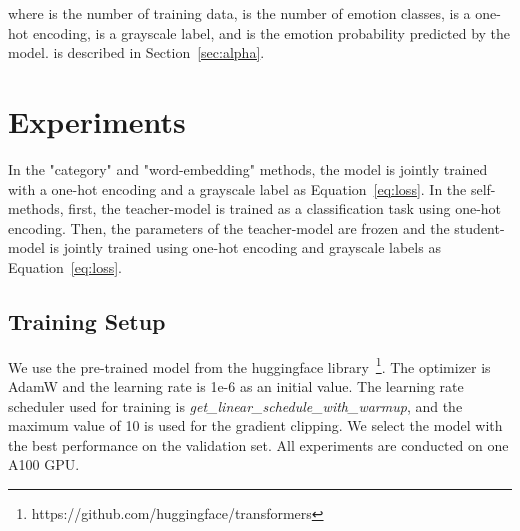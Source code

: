 \documentclass[a4paper]{article}
\begin{document}
where  is the number of training data,  is the number of emotion classes,  is a one-hot encoding,  is a grayscale label, and  is the emotion probability predicted by the model.  is described in Section~\ref{sec:alpha}.


\begin{table}[!t]
\centering
{}
\caption{Statistics for 4 datasets.}
\label{Tab:dataset}
\end{table}

\section{Experiments}
In the "category" and "word-embedding" methods, the model is jointly trained with a one-hot encoding and a grayscale label as Equation~\ref{eq:loss}. In the self-methods, first, the teacher-model is trained as a classification task using one-hot encoding. Then, the parameters of the teacher-model are frozen and the student-model is jointly trained using one-hot encoding and grayscale labels as Equation~\ref{eq:loss}. 


\subsection{Training Setup}
\label{sec:setup_appendix}
We use the pre-trained model from the huggingface library~\footnote{https://github.com/huggingface/transformers}. The optimizer is AdamW and the learning rate is 1e-6 as an initial value. The learning rate scheduler used for training is \textit{get\_linear\_schedule\_with\_warmup}, and the maximum value of 10 is used for the gradient clipping. We select the model with the best performance on the validation set. All experiments are conducted on one A100 GPU.
\end{document}
